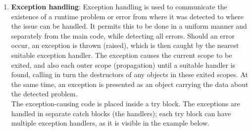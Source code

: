 \begin{enumerate}
\item \textbf{Exception handling}: Exception handling is used to communicate the existence of a runtime problem or error from where it was detected to where the issue can be handled. It permits this to be done in a uniform manner and separately from the main code, while detecting all errors. Should an error occur, an exception is thrown (raised), which is then caught by the nearest suitable exception handler. The exception causes the current scope to be exited, and also each outer scope (propagation) until a suitable handler is found, calling in turn the destructors of any objects in these exited scopes. At the same time, an exception is presented as an object carrying the data about the detected problem.\\
The exception-causing code is placed inside a try block. The exceptions are handled in separate catch blocks (the handlers); each try block can have multiple exception handlers, as it is visible in the example below.
\end{enumerate}
